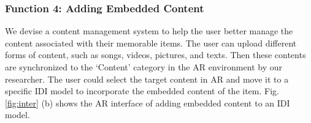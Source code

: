 \subsubsection{Function 4: Adding Embedded Content} 
We devise a content management system to help the user better manage the content associated with their memorable items. 
The user can upload different forms of content, such as songs, videos, pictures, and texts.
Then these contents are synchronized to the `Content' category in the AR environment by our researcher.
The user could select the target content in AR and move it to a specific IDI model to incorporate the embedded content of the item.
Fig. \ref{fig:inter} (b) shows the AR interface of adding embedded content to an IDI model.



